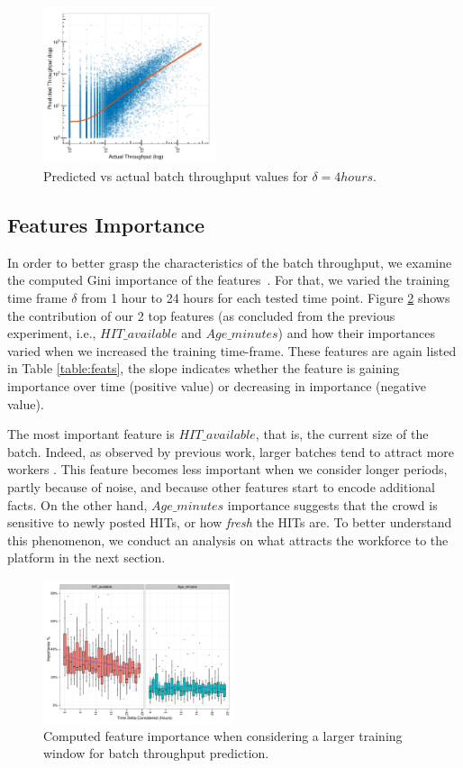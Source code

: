 \begin{figure}[t!]
	\centering
		\includegraphics[width=0.45\textwidth]{figures/predictions_3}
	\caption{Predicted vs actual batch throughput values for $\delta=4hours$.}
	\label{fig:pred}
\end{figure}

\subsection{Features Importance}

In order to better grasp the characteristics of the batch throughput, we examine the computed Gini importance of the  features~\cite{breiman}. 
For that, we varied the training time frame $\delta$ from 1 hour to 24 hours for each tested time point. 
Figure \ref{fig:importances} shows the contribution of our 2 top features (as concluded from the previous experiment, i.e., $HIT\_available$ and $Age\_minutes$) and how their importances varied when we increased the training time-frame. These features are again listed in Table \ref{table:feats}, the slope indicates whether the feature is gaining importance over time (positive value) or decreasing in importance (negative value).

The most important feature is $HIT\_available$, that is, the current size of the batch. Indeed, as observed by previous work, larger batches tend to attract more workers \cite{mturk,crowddb}. This feature becomes less important when we consider longer periods, partly because of noise, and because other features start to encode additional facts.
On the other hand, $Age\_minutes$ importance suggests that the crowd is sensitive to newly posted HITs, or how \emph{fresh} the HITs are. 
To better understand this phenomenon, we conduct an analysis on what attracts the workforce to the platform in the next section.

\begin{figure}[t!]
	\centering
		\includegraphics[width=0.5\textwidth]{figures/importances}
	\caption{Computed feature importance when considering a larger training window for batch throughput prediction.}
	\label{fig:importances}
\end{figure}

